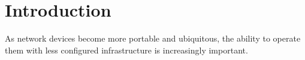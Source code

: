 \section{Introduction}
\label{sec:introduction}

As network devices become more portable and ubiquitous, the ability to operate them with less configured infrastructure is increasingly important\cite{rfc6762}. 
